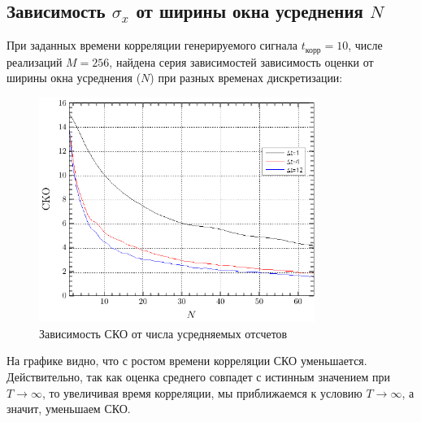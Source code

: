 \documentclass[a4paper,14pt]{extarticle}
\begin{document}
\subsection{Зависимость $\sigma_x$ от ширины окна усреднения $N$}
При заданных времени корреляции генерируемого сигнала $t_\text{корр}=10$, числе реализаций $M=256$, найдена серия зависимостей зависимость оценки от ширины окна усреднения ($N$) при разных временах дискретизации:
\begin{figure}[H]
    \centering
    \includegraphics[width=0.8\textwidth]{fig/sko_t10.pdf}
    \caption{Зависимость СКО от числа усредняемых отсчетов}
    \label{fig:sko_from_n_t10}
\end{figure}
На графике видно, что с ростом времени корреляции СКО уменьшается. Действительно, так как оценка среднего совпадет\footnotemark{} с истинным значением при $T \to \infty$, то увеличивая время корреляции, мы приближаемся к условию $T \to \infty$, а значит, уменьшаем СКО.
\end{document}
